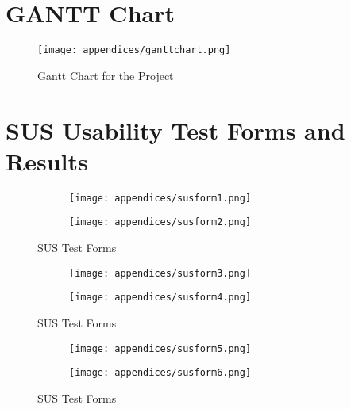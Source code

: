 \chapter{GANTT Chart}
\label{app:data}
\begin{figure}[h]
    \centering
    \texttt{[image: appendices/ganttchart.png]}
    \caption{Gantt Chart for the Project}
    \label{fig:myfig83}
\end{figure}
\clearpage
\chapter{SUS Usability Test Forms and Results}
\begin{figure}[h]
    \centering
    \begin{subfigure}[b]{0.65\textwidth}
        \centering
        \texttt{[image: appendices/susform1.png]}
        \vspace{0.8cm}
        \label{fig:sub1}
    \end{subfigure}
    \hspace{0.08\textwidth}
    \begin{subfigure}[b]{0.65\textwidth}
        \centering
        \texttt{[image: appendices/susform2.png]}
        \label{fig:sub2}
    \end{subfigure}
    \caption{SUS Test Forms}
    \label{fig:myfig85}
\end{figure}
\clearpage
\begin{figure}[h]
    \centering
    \begin{subfigure}[b]{0.75\textwidth}
        \centering
        \texttt{[image: appendices/susform3.png]}
        \vspace{0.8cm}
        \label{fig:sub1}
    \end{subfigure}
    \hspace{0.08\textwidth}
    \begin{subfigure}[b]{0.75\textwidth}
        \centering
        \texttt{[image: appendices/susform4.png]}
        \label{fig:sub2}
    \end{subfigure}
    \caption{SUS Test Forms}
    \label{fig:myfig86}
\end{figure}
\clearpage
\begin{figure}[h]
    \centering
    \begin{subfigure}[b]{0.75\textwidth}
        \centering
        \texttt{[image: appendices/susform5.png]}
        \vspace{0.8cm}
        \label{fig:sub1}
    \end{subfigure}
    \hspace{0.08\textwidth}
    \begin{subfigure}[b]{0.75\textwidth}
        \centering
        \texttt{[image: appendices/susform6.png]}
        \label{fig:sub2}
    \end{subfigure}
    \caption{SUS Test Forms}
    \label{fig:myfig87}
\end{figure}

